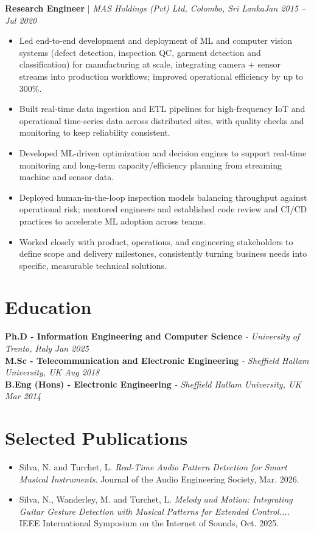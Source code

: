 \documentclass[11pt]{article}
\newenvironment{cvrole}[5]{%
  \par\noindent\textbf{\large #1} | \textit{\small #2, #3}\hfill \textit{\small #4 -- #5}\par
  \begin{itemize}[leftmargin=2em, itemsep=-0.3em, topsep=-0.5em]%
}{%
  \end{itemize}\par\noindent\mbox{}\par\vspace{0.1em}%
}
\begin{document}
\begin{cvrole}{Research Engineer}{MAS Holdings (Pvt) Ltd}{Colombo, Sri Lanka}{Jan 2015}{Jul 2020}
    \item Led end-to-end development and deployment of ML and computer vision systems (defect detection, inspection QC, garment detection and classification) for manufacturing at scale, integrating camera + sensor streams into production workflows; improved operational efficiency by up to 300\%.
    \item Built real-time data ingestion and ETL pipelines for high-frequency IoT and operational time-series data across distributed sites, with quality checks and monitoring to keep reliability consistent.
    \item Developed ML-driven optimization and decision engines to support real-time monitoring and long-term capacity/efficiency planning from streaming machine and sensor data.
    \item Deployed human-in-the-loop inspection models balancing throughput against operational risk; mentored engineers and established code review and CI/CD practices to accelerate ML adoption across teams.
    \item Worked closely with product, operations, and engineering stakeholders to define scope and delivery milestones, consistently turning business needs into specific, measurable technical solutions.
\end{cvrole}

\section*{Education}
\noindent\textbf{Ph.D - Information Engineering and Computer Science} \textit{\small{ - University of Trento, Italy}} \hfill \textit{Jan 2025}\\[2pt]
\noindent\textbf{M.Sc - Telecommunication and Electronic Engineering} \textit{\small{ - Sheffield Hallam University, UK}} \hfill \textit{Aug 2018}\\[2pt]
\noindent\textbf{B.Eng (Hons) - Electronic Engineering} \textit{\small{ - Sheffield Hallam University, UK}} \hfill \textit{Mar 2014}

\section*{Selected Publications \footnotesize {}}
\begin{itemize}[leftmargin=1.2em, itemsep=-0.25em]
    \item Silva, N. and Turchet, L. \textit{Real-Time Audio Pattern Detection for Smart Musical Instruments}. Journal of the Audio Engineering Society, Mar. 2026.
    \item Silva, N., Wanderley, M. and Turchet, L. \textit{Melody and Motion: Integrating Guitar Gesture Detection with Musical Patterns for Extended Control....} IEEE International Symposium on the Internet of Sounds, Oct. 2025.
\end{itemize}
\end{document}
